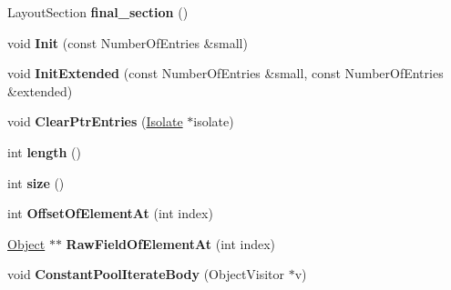 \begin{DoxyCompactItemize}
\item 
\hypertarget{classv8_1_1internal_1_1_constant_pool_array_a09aede0f9a9558c5621dddb7de2e76e9}{}Layout\+Section {\bfseries final\+\_\+section} ()\label{classv8_1_1internal_1_1_constant_pool_array_a09aede0f9a9558c5621dddb7de2e76e9}

\item 
\hypertarget{classv8_1_1internal_1_1_constant_pool_array_aa887a0e6d181ea1885c4e08356b143c8}{}void {\bfseries Init} (const Number\+Of\+Entries \&small)\label{classv8_1_1internal_1_1_constant_pool_array_aa887a0e6d181ea1885c4e08356b143c8}

\item 
\hypertarget{classv8_1_1internal_1_1_constant_pool_array_a5e0f27c91bd60cec83bef536ea4549df}{}void {\bfseries Init\+Extended} (const Number\+Of\+Entries \&small, const Number\+Of\+Entries \&extended)\label{classv8_1_1internal_1_1_constant_pool_array_a5e0f27c91bd60cec83bef536ea4549df}

\item 
\hypertarget{classv8_1_1internal_1_1_constant_pool_array_a4c3909b0553040be37bc5984b8108db9}{}void {\bfseries Clear\+Ptr\+Entries} (\hyperlink{classv8_1_1internal_1_1_isolate}{Isolate} $\ast$isolate)\label{classv8_1_1internal_1_1_constant_pool_array_a4c3909b0553040be37bc5984b8108db9}

\item 
\hypertarget{classv8_1_1internal_1_1_constant_pool_array_a337ab66e461e32b8a9e4252d39d09c88}{}int {\bfseries length} ()\label{classv8_1_1internal_1_1_constant_pool_array_a337ab66e461e32b8a9e4252d39d09c88}

\item 
\hypertarget{classv8_1_1internal_1_1_constant_pool_array_a32cec2f2c8f0ee8825e2454985e9e29d}{}int {\bfseries size} ()\label{classv8_1_1internal_1_1_constant_pool_array_a32cec2f2c8f0ee8825e2454985e9e29d}

\item 
\hypertarget{classv8_1_1internal_1_1_constant_pool_array_a90e86eff7d0765e0c5e4b8bc2bddc4e7}{}int {\bfseries Offset\+Of\+Element\+At} (int index)\label{classv8_1_1internal_1_1_constant_pool_array_a90e86eff7d0765e0c5e4b8bc2bddc4e7}

\item 
\hypertarget{classv8_1_1internal_1_1_constant_pool_array_a760f1bcb0a37ad6a1f9b19e21a7bc406}{}\hyperlink{classv8_1_1internal_1_1_object}{Object} $\ast$$\ast$ {\bfseries Raw\+Field\+Of\+Element\+At} (int index)\label{classv8_1_1internal_1_1_constant_pool_array_a760f1bcb0a37ad6a1f9b19e21a7bc406}

\item 
\hypertarget{classv8_1_1internal_1_1_constant_pool_array_ab89be13a36a320df7c482eaf623bcf6f}{}void {\bfseries Constant\+Pool\+Iterate\+Body} (Object\+Visitor $\ast$v)\label{classv8_1_1internal_1_1_constant_pool_array_ab89be13a36a320df7c482eaf623bcf6f}

\end{DoxyCompactItemize}
